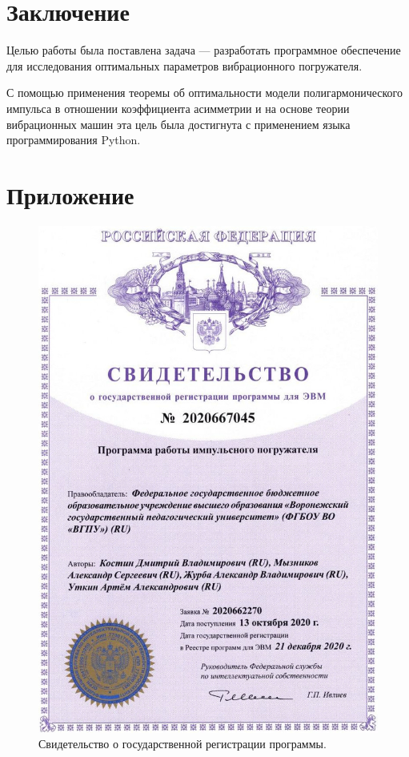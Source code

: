 \clearpage
\section{Заключение}

Целью работы была поставлена задача --- разработать программное обеспечение для исследования оптимальных параметров вибрационного погружателя.

С помощью применения теоремы об оптимальности модели полигармонического импульса в отношении коэффициента асимметрии и на основе теории вибрационных машин
эта цель была достигнута с применением языка программирования Python.


\clearpage
{}
\nocite{*}
\printbibliography{}

\clearpage
\section*{Приложение}
\begin{figure}[h]
    \centering
    \includegraphics[width=0.77\linewidth]{img/cert.jpg}
    \caption{Свидетельство о государственной регистрации программы.}
    \label{fig:cert}
\end{figure}
